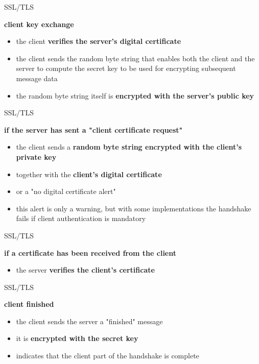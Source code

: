 \documentclass[pdf]{beamer}
\begin{document}
\begin{frame}{SSL/TLS}

\textbf{client key exchange}

\begin{itemize}
\item
the client \textbf{verifies the server's digital certificate}

\item
the client sends the random byte string that enables both the client and the server to compute the secret key to be used for encrypting subsequent message data

\item
the random byte string itself is \textbf{encrypted with the server's public key}

\end{itemize}
\end{frame}



\begin{frame}{SSL/TLS}

\textbf{if the server has sent a "client certificate request"}

\begin{itemize}
\item
the client sends a \textbf{random byte string encrypted with the client's private key}

\item
together with the \textbf{client's digital certificate}

\item
or a "no digital certificate alert"

\item
this alert is only a warning, but with some implementations the handshake fails if client authentication is mandatory
\end{itemize}
\end{frame}



\begin{frame}{SSL/TLS}

\textbf{if a certificate has been received from the client}

\begin{itemize}
\item
the server \textbf{verifies the client's certificate}
\end{itemize}
\end{frame}



\begin{frame}{SSL/TLS}

\textbf{client finished}

\begin{itemize}
\item
the client sends the server a "finished" message

\item
it is \textbf{encrypted with the secret key}

\item
indicates that the client part of the handshake is complete
\end{itemize}
\end{frame}
\end{document}
